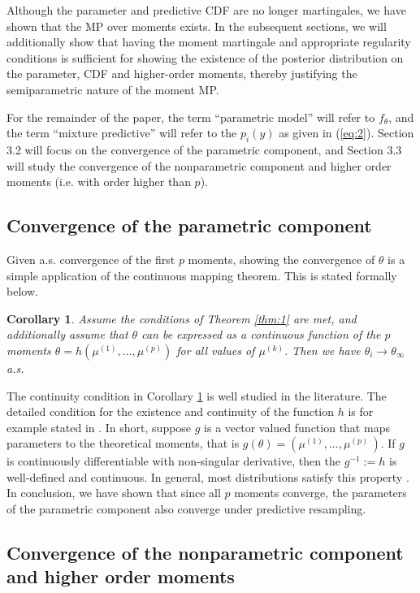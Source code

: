 \documentclass[11pt,a4paper]{article}
\theoremstyle{plain}
\newtheorem{corollary}{Corollary}
\theoremstyle{remark}
\theoremstyle{remark}
\begin{document}
 Although the parameter and predictive CDF are no longer martingales, we have shown that the MP over moments exists. In the subsequent sections, we will additionally show that having the moment martingale and appropriate regularity conditions is sufficient for showing the existence of the posterior distribution on the parameter, CDF and higher-order moments, thereby justifying the semiparametric nature of the moment MP.
 
 For the remainder of the paper,  the term ``parametric model'' will refer to $f_\theta$, and the term ``mixture predictive'' will refer to the $p_i(y)$ as given in (\ref{eq:2}).  Section 3.2 will focus on the convergence of the parametric component, and Section 3.3 will study the convergence of the nonparametric component and higher order moments (i.e. with order higher than $p$). 
 

\subsection{Convergence of the parametric component}


Given a.s. convergence of the first $p$ moments, showing the convergence of $\theta$ is a simple application of the continuous mapping theorem. This is stated formally below.
\begin{corollary} \label{cor:paraconverge}
 Assume the conditions of Theorem \ref{thm:1} are met, and additionally assume that $\theta$ can be expressed as a continuous function of the $p$ moments $\theta= h(\mu^{(1)},...,\mu^{(p)})$ for all values of $\mu^{(k)}$. Then we have $\theta_i \to \theta_\infty$ a.s.
\end{corollary}
The continuity condition in Corollary \ref{cor:paraconverge} is well studied in the literature. The detailed condition for the existence and continuity of the function $h$ is for example stated in \citet[Lemma 4.3]{van2000}. In short, suppose $g$ is a vector valued function that maps parameters to the theoretical moments, that is $g(\theta)=(\mu^{(1)},...,\mu^{(p)}\,)$. If $g$ is continuously differentiable with non-singular derivative, then the $g^{-1}:=h$ is well-defined and continuous. In general, most distributions satisfy this property \citep{van2000}. In conclusion, we have shown that since all $p$ moments converge, the parameters of the parametric component also converge under predictive resampling. 



\subsection{Convergence of the nonparametric component and higher order moments}
\end{document}
